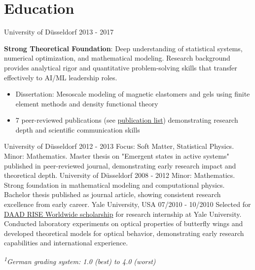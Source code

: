 \documentclass[singlesided,
               paper=a4,
               fontsize=10pt
              ]{my-resume}
\begin{document}
\section[\faMortarBoard]{Education}
    {University of Düsseldorf}
    {2013 - 2017}
    {
        \textbf{Strong Theoretical Foundation}: Deep understanding of statistical systems, numerical optimization, and mathematical modeling. Research background provides analytical rigor and quantitative problem-solving skills that transfer effectively to AI/ML leadership roles.
        \begin{itemize}[leftmargin=2em]
            \item Dissertation: Mesoscale modeling of magnetic elastomers and gels using finite element methods and density functional theory
            \item 7 peer-reviewed publications (see \href{https://scholar.google.com/citations?hl=de&user=MnU8ZxwAAAAJ}{publication list}) demonstrating research depth and scientific communication skills
        \end{itemize}
    }
%
    {University of Düsseldorf}
    {2012 - 2013}
    {
        Focus: Soft Matter, Statistical Physics. Minor: Mathematics. Master thesis on "Emergent states in active systems" published in peer-reviewed journal, demonstrating early research impact and theoretical depth.
    }
%
    {University of Düsseldorf}
    {2008 - 2012}
    {
        Minor: Mathematics. Strong foundation in mathematical modeling and computational physics. Bachelor thesis published as journal article, showing consistent research excellence from early career.
    }
%
    {Yale University, USA}
    {07/2010 - 10/2010}
    {
        Selected for \href{https://www.daad.de/rise/en/rise-worldwide/about-the-programm/}{DAAD RISE Worldwide scholarship} for research internship at Yale University. Conducted laboratory experiments on optical properties of butterfly wings and developed theoretical models for optical behavior, demonstrating early research capabilities and international experience.
    }

\vspace{0.5em}
\textit{\small \textsuperscript{1}German grading system: 1.0 (best) to 4.0 (worst)}
\end{document}
